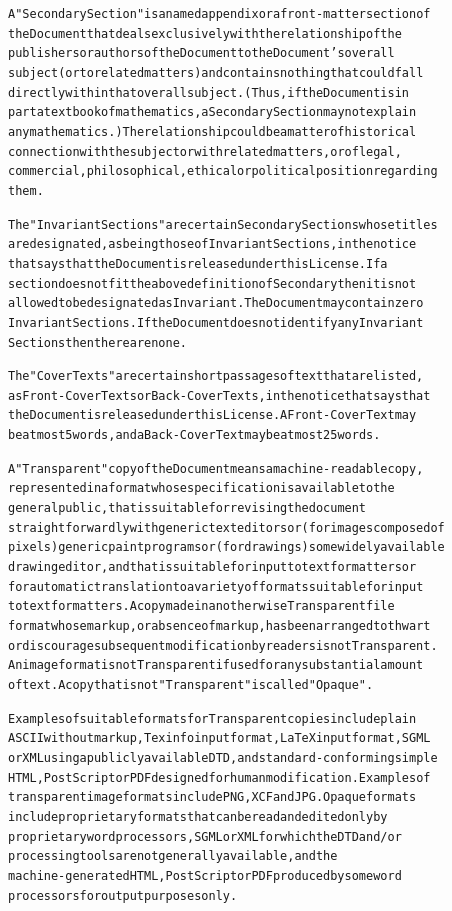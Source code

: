 \documentclass[DIV=12,%
               BCOR=0mm,%
               fontsize=10pt,%
               oneside,%
               paper=210mm:11in]{scrbook}
\begin{document}
\begin{alltt}
A "Secondary Section" is a named appendix or a front-matter section of
the Document that deals exclusively with the relationship of the
publishers or authors of the Document to the Document's overall
subject (or to related matters) and contains nothing that could fall
directly within that overall subject.  (Thus, if the Document is in
part a textbook of mathematics, a Secondary Section may not explain
any mathematics.)  The relationship could be a matter of historical
connection with the subject or with related matters, or of legal,
commercial, philosophical, ethical or political position regarding
them.

The "Invariant Sections" are certain Secondary Sections whose titles
are designated, as being those of Invariant Sections, in the notice
that says that the Document is released under this License.  If a
section does not fit the above definition of Secondary then it is not
allowed to be designated as Invariant.  The Document may contain zero
Invariant Sections.  If the Document does not identify any Invariant
Sections then there are none.

The "Cover Texts" are certain short passages of text that are listed,
as Front-Cover Texts or Back-Cover Texts, in the notice that says that
the Document is released under this License.  A Front-Cover Text may
be at most 5 words, and a Back-Cover Text may be at most 25 words.

A "Transparent" copy of the Document means a machine-readable copy,
represented in a format whose specification is available to the
general public, that is suitable for revising the document
straightforwardly with generic text editors or (for images composed of
pixels) generic paint programs or (for drawings) some widely available
drawing editor, and that is suitable for input to text formatters or
for automatic translation to a variety of formats suitable for input
to text formatters.  A copy made in an otherwise Transparent file
format whose markup, or absence of markup, has been arranged to thwart
or discourage subsequent modification by readers is not Transparent.
An image format is not Transparent if used for any substantial amount
of text.  A copy that is not "Transparent" is called "Opaque".

Examples of suitable formats for Transparent copies include plain
ASCII without markup, Texinfo input format, LaTeX input format, SGML
or XML using a publicly available DTD, and standard-conforming simple
HTML, PostScript or PDF designed for human modification.  Examples of
transparent image formats include PNG, XCF and JPG.  Opaque formats
include proprietary formats that can be read and edited only by
proprietary word processors, SGML or XML for which the DTD and/or
processing tools are not generally available, and the
machine-generated HTML, PostScript or PDF produced by some word
processors for output purposes only.


\end{alltt}
\end{document}
